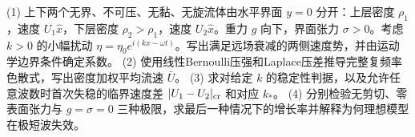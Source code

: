 (1) 上下两个无界、不可压、无黏、无旋流体由水平界面 \(y=0\) 分开：上层密度 \(\rho_1\)，速度 \(U_1\hat x\)，下层密度 \(\rho_2>\rho_1\)，速度 \(U_2\hat x\)。重力 \(g\) 向下，界面张力 \(\sigma>0\)。考虑 \(k>0\) 的小幅扰动 \(\eta=\eta_0e^{i(kx-\omega t)}\)。写出满足远场衰减的两侧速度势，并由运动学边界条件确定系数。
(2) 使用线性Bernoulli压强和Laplace压差推导完整复频率色散式，写出密度加权平均流速 \(\bar U\)。
(3) 求对给定 \(k\) 的稳定性判据，以及允许任意波数时首次失稳的临界速度差 \(|U_1-U_2|_{\rm cr}\) 和对应 \(k_*\)。
(4) 分别检验无剪切、零表面张力与 \(g=\sigma=0\) 三种极限，求最后一种情况下的增长率并解释为何理想模型在极短波失效。

